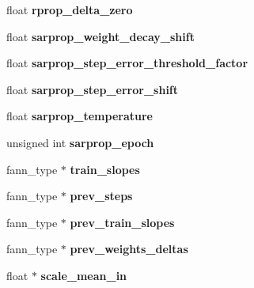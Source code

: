 \begin{DoxyCompactItemize}
\item 
\hypertarget{structfann_a02bd282cae5f43ecf164742d850724f0}{float {\bfseries rprop\-\_\-delta\-\_\-zero}}\label{structfann_a02bd282cae5f43ecf164742d850724f0}

\item 
\hypertarget{structfann_a08775174617b5ef2191054fd2acc7f34}{float {\bfseries sarprop\-\_\-weight\-\_\-decay\-\_\-shift}}\label{structfann_a08775174617b5ef2191054fd2acc7f34}

\item 
\hypertarget{structfann_a184d71b263383b363fc44b7695616430}{float {\bfseries sarprop\-\_\-step\-\_\-error\-\_\-threshold\-\_\-factor}}\label{structfann_a184d71b263383b363fc44b7695616430}

\item 
\hypertarget{structfann_a60ecac0c74aa107d6a7886889a9aa846}{float {\bfseries sarprop\-\_\-step\-\_\-error\-\_\-shift}}\label{structfann_a60ecac0c74aa107d6a7886889a9aa846}

\item 
\hypertarget{structfann_a133b65a2b498659df264226d0317bf88}{float {\bfseries sarprop\-\_\-temperature}}\label{structfann_a133b65a2b498659df264226d0317bf88}

\item 
\hypertarget{structfann_a88f93c0246c7054c85bd0b776cb03291}{unsigned int {\bfseries sarprop\-\_\-epoch}}\label{structfann_a88f93c0246c7054c85bd0b776cb03291}

\item 
\hypertarget{structfann_af6b968e555f0d87c988e5f56ee4760d9}{fann\-\_\-type $\ast$ {\bfseries train\-\_\-slopes}}\label{structfann_af6b968e555f0d87c988e5f56ee4760d9}

\item 
\hypertarget{structfann_a1ac54ac64e59a49c9a6173d0acb9fc88}{fann\-\_\-type $\ast$ {\bfseries prev\-\_\-steps}}\label{structfann_a1ac54ac64e59a49c9a6173d0acb9fc88}

\item 
\hypertarget{structfann_a2d7ffce3351fad93e149c5fb55df7d4a}{fann\-\_\-type $\ast$ {\bfseries prev\-\_\-train\-\_\-slopes}}\label{structfann_a2d7ffce3351fad93e149c5fb55df7d4a}

\item 
\hypertarget{structfann_aee3a8cdeb2061d7a15fe329b3d59f7ca}{fann\-\_\-type $\ast$ {\bfseries prev\-\_\-weights\-\_\-deltas}}\label{structfann_aee3a8cdeb2061d7a15fe329b3d59f7ca}

\item 
\hypertarget{structfann_a1c8ef174c82c08a0bf133bbcdc866f43}{float $\ast$ {\bfseries scale\-\_\-mean\-\_\-in}}\label{structfann_a1c8ef174c82c08a0bf133bbcdc866f43}


\end{DoxyCompactItemize}
